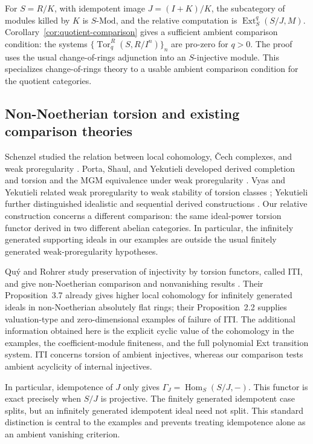 \documentclass[11pt,reqno]{amsart}
\theoremstyle{definition}
\theoremstyle{remark}
\newcommand{\Mod}{\text{-}\mathrm{Mod}}
\newcommand{\Hom}{\operatorname{Hom}}
\newcommand{\Ext}{\operatorname{Ext}}
\newcommand{\Tor}{\operatorname{Tor}}
\begin{document}
For $S=R/K$, with idempotent image $J=(I+K)/K$, the subcategory of modules killed by $K$ is $S\Mod$, and the relative computation is $\Ext_S^q(S/J,M)$. Corollary~\ref{cor:quotient-comparison} gives a sufficient ambient comparison condition: the systems $\{\Tor_q^R(S,R/I^n)\}_n$ are pro-zero for $q>0$. The proof uses the usual change-of-rings adjunction into an $S$-injective module. This specializes change-of-rings theory to a usable ambient comparison condition for the quotient categories.

\subsection{Non-Noetherian torsion and existing comparison theories}
Schenzel studied the relation between local cohomology, \v{C}ech complexes, and weak proregularity \cite{Schenzel2003}. Porta, Shaul, and Yekutieli developed derived completion and torsion and the MGM equivalence under weak proregularity \cite{PortaShaulYekutieli2014}. Vyas and Yekutieli related weak proregularity to weak stability of torsion classes \cite{VyasYekutieli2018}; Yekutieli further distinguished idealistic and sequential derived constructions \cite{Yekutieli2021}. Our relative construction concerns a different comparison: the same ideal-power torsion functor derived in two different abelian categories. In particular, the infinitely generated supporting ideals in our examples are outside the usual finitely generated weak-proregularity hypotheses.

Qu\'y and Rohrer study preservation of injectivity by torsion functors, called ITI, and give non-Noetherian comparison and nonvanishing results \cite{QuyRohrer2017}. Their Proposition~3.7 already gives higher local cohomology for infinitely generated ideals in non-Noetherian absolutely flat rings; their Proposition~2.2 supplies valuation-type and zero-dimensional examples of failure of ITI. The additional information obtained here is the explicit cyclic value of the cohomology in the examples, the coefficient-module finiteness, and the full polynomial Ext transition system. ITI concerns torsion of ambient injectives, whereas our comparison tests ambient acyclicity of internal injectives.

In particular, idempotence of $J$ only gives $\Gamma_J=\Hom_S(S/J,-)$. This functor is exact precisely when $S/J$ is projective. The finitely generated idempotent case splits, but an infinitely generated idempotent ideal need not split. This standard distinction is central to the examples and prevents treating idempotence alone as an ambient vanishing criterion.
\end{document}
